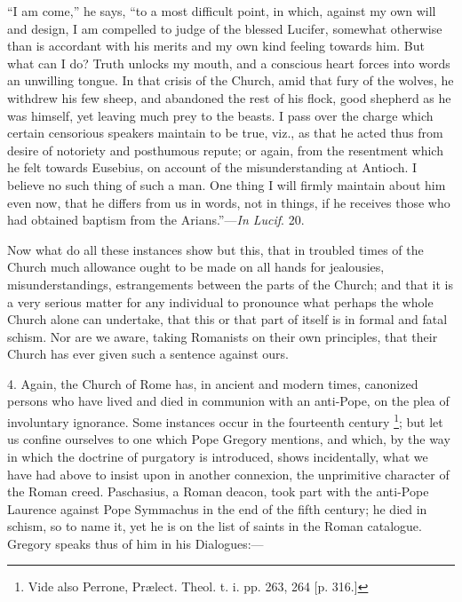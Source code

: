 ``I am come,''
he says, ``to a most difficult point, in which, against my own will
and design, I am compelled to judge of the blessed Lucifer, somewhat
otherwise than is accordant with his merits and my own kind feeling
towards him. But what can I do? Truth unlocks my mouth, and a
conscious heart forces into words an unwilling tongue. In that crisis
of the Church, amid that fury of the wolves, he withdrew his few
sheep, and abandoned the rest of his flock, good shepherd as he was
himself, yet leaving much prey to the beasts. I pass over the charge
which certain censorious speakers maintain to be true, viz., as that
he acted thus from desire of notoriety and posthumous repute; or
again, from the resentment which he felt towards Eusebius, on account
of the misunderstanding at Antioch. I believe no such thing of such a
man. One thing I will firmly maintain about him even now, that he
differs from us in words, not in things, if he receives those who had
obtained baptism from the Arians.''—\emph{In Lucif}. 20.

Now what do all these instances show but this,
that in troubled times of the Church much allowance ought to be made
on all hands for jealousies, misunderstandings, estrangements between
the parts of the Church; and that it is a very serious matter for any
individual to pronounce what perhaps the whole Church alone can
undertake, that this or that part of itself is in formal and fatal
schism. Nor are we aware, taking Romanists on their own principles,
that their Church has ever given such a sentence against ours.

4. Again, the Church of Rome has, in ancient and
modern times, canonized persons who have lived and died in communion
with an anti-Pope, on the plea of involuntary ignorance. Some
instances occur in the fourteenth century \footnote{Vide also Perrone, Prælect. Theol. t. i. pp.
263, 264 [p. 316.]}; but let us confine
ourselves to one which Pope Gregory mentions, and which, by the way in
which the doctrine of purgatory is introduced, shows incidentally,
what we have had above to insist upon in another connexion, the
unprimitive character of the Roman creed. Paschasius, a Roman deacon,
took part with the anti-Pope Laurence against Pope Symmachus in the
end of the fifth century; he died in schism, so to name it, yet he is
on the list of saints in the Roman catalogue. Gregory speaks thus of
him in his Dialogues:—

